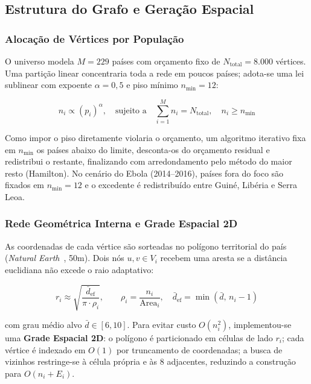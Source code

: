 \documentclass[11pt]{article}
\begin{document}
\subsection{Estrutura do Grafo e Geração Espacial}

\subsubsection{Alocação de Vértices por População}

O universo modela $M = 229$ países com orçamento fixo de $N_{\mathrm{total}} = 8{.}000$ vértices. Uma partição linear concentraria toda a rede em poucos países; adota-se uma lei sublinear com expoente $\alpha = 0{,}5$ e piso mínimo $n_{\min} = 12$:

\begin{equation}
n_i \propto (p_i)^{\alpha}, \quad \text{sujeito a} \quad \sum_{i=1}^{M} n_i = N_{\mathrm{total}}, \quad n_i \geq n_{\min}
\end{equation}

Como impor o piso diretamente violaria o orçamento, um algoritmo iterativo fixa em $n_{\min}$ os países abaixo do limite, desconta-os do orçamento residual e redistribui o restante, finalizando com arredondamento pelo método do maior resto (Hamilton). No cenário do Ebola (2014--2016), países fora do foco são fixados em $n_{\min} = 12$ e o excedente é redistribuído entre Guiné, Libéria e Serra Leoa.

\subsubsection{Rede Geométrica Interna e Grade Espacial 2D}

As coordenadas de cada vértice são sorteadas no polígono territorial do país (\emph{Natural Earth}~\cite{natural_earth}, 50m). Dois nós $u, v \in V_i$ recebem uma aresta se a distância euclidiana não excede o raio adaptativo:

\begin{equation}
r_i \approx \sqrt{\frac{\bar{d}_{\mathrm{ef}}}{\pi \cdot \rho_i}}, \qquad \rho_i = \frac{n_i}{\mathrm{Area}_i}, \quad \bar{d}_{\mathrm{ef}} = \min(\bar{d},\, n_i - 1)
\end{equation}

com grau médio alvo $\bar{d} \in [6, 10]$. Para evitar custo $O(n_i^2)$, implementou-se uma \textbf{Grade Espacial 2D}: o polígono é particionado em células de lado $r_i$; cada vértice é indexado em $O(1)$ por truncamento de coordenadas; a busca de vizinhos restringe-se à célula própria e às 8 adjacentes, reduzindo a construção para $O(n_i + E_i)$.
\end{document}
